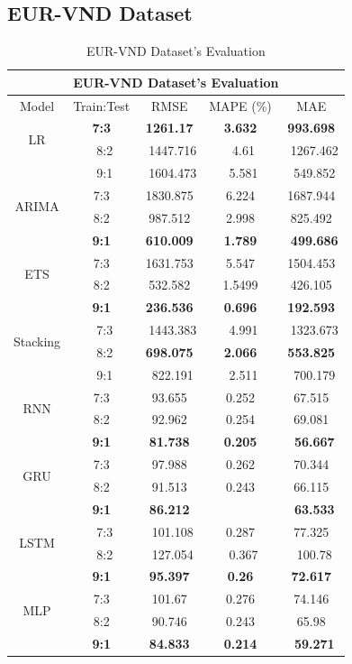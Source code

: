 \documentclass{ieeeojies}
\begin{document}
\subsection{EUR-VND Dataset} 
\begin{table}[H]
    \centering
    \begin{tabular}{|c|c|c|c|c|}
         \hline
         \multicolumn{5}{|c|}{\textbf{EUR-VND Dataset's Evaluation}}\\
         \hline
         \centering Model & Train:Test & RMSE & MAPE (\%) & MAE\\
         \hline
         \multirow{2}{*}{LR} &\textbf{7:3} &\textbf{1261.17} &\textbf{3.632} &\textbf{993.698} \\ &\ 8:2 &\ 1447.716 &\ 4.61 &\ 1267.462 \\&\ 9:1 &\ 1604.473 &\ 5.581 &\ 549.852 \\
         \hline
         \multirow{2}{*}{ARIMA} & 7:3 & 1830.875 & 6.224 & 1687.944 \\ & 8:2 & 987.512 & 2.998 & 825.492 \\ & \textbf{9:1} & \textbf{610.009} & \textbf{1.789} &\ \textbf{499.686} \\
         \hline
         \multirow{2}{*}{ETS} & 7:3 & 1631.753 & 5.547 & 1504.453 \\ & 8:2 & 532.582&1.5499&426.105 \\& \textbf{9:1} & \textbf{236.536} & \textbf{0.696} & \textbf{192.593} \\
         \hline
         \multirow{2}{*}{Stacking} &\ 7:3 &\ 1443.383 &\ 4.991 &\ 1323.673 \\ &\ 8:2 &\textbf{698.075} &\textbf{2.066} &\textbf{553.825}\\&\ 9:1 &\ 822.191 &\ 2.511 &\ 700.179 \\
         \hline
         \multirow{2}{*}{RNN} & 7:3 & 93.655 & 0.252 & 67.515 \\ & 8:2 & 92.962 & 0.254 & 69.081 \\ & \textbf{9:1} & \textbf{81.738} & \textbf{0.205} &\ \textbf{56.667} \\
         \hline
         \multirow{2}{*}{GRU} & 7:3 & 97.988 & 0.262 & 70.344 \\ & 8:2 & 91.513 & 0.243 & 66.115 \\ & \textbf{9:1} & \textbf{86.212} & \textbf{0.229 &\ \textbf{63.533} \\
         \hline
         \multirow{2}{*}{LSTM} &\ 7:3 &\ 101.108 &0.287 &77.325\\ &\ 8:2 &\ 127.054&\ 0.367 &\ 100.78 \\&\textbf{9:1}&\textbf{95.397} &\textbf{0.26} &\textbf{72.617} \\
         \hline
         \multirow{2}{*}{MLP} & 7:3 & 101.67 & 0.276 & 74.146 \\ & 8:2 & 90.746 & 0.243 & 65.98 \\ & \textbf{9:1} & \textbf{84.833} & \textbf{0.214} &\ \textbf{59.271} \\
         \hline
    \end{tabular}
    \caption{EUR-VND Dataset's Evaluation}
    \label{vcbresult}
\end{table}
\end{document}
